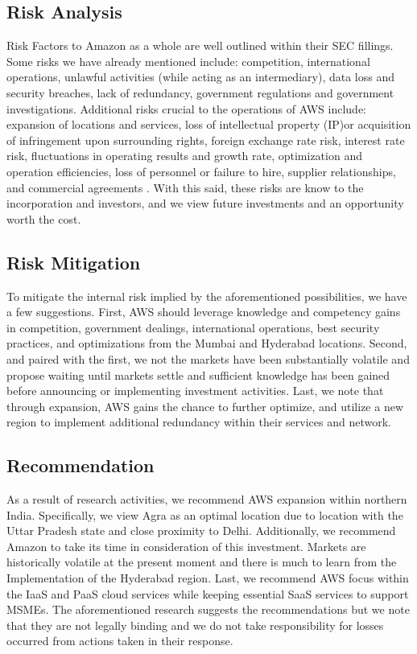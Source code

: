 \documentclass[a4paper, 12pt]{article}
\begin{document}
\subsection{Risk Analysis}
Risk Factors to Amazon as a whole are well outlined within their SEC fillings. 
Some risks we have already mentioned include: competition, international operations, unlawful activities (while acting as an intermediary), data loss and security breaches, lack of redundancy, government regulations and government investigations. 
Additional risks crucial to the operations of AWS include: expansion of locations and services, loss of intellectual property (IP)or acquisition of infringement upon surrounding rights, foreign exchange rate risk, interest rate risk, fluctuations in operating results and growth rate, optimization and operation efficiencies, loss of personnel or failure to hire, supplier relationships, and commercial agreements \cite[p.~6, 8-11]{AMZN_10K_2021}.
With this said, these risks are know to the incorporation and investors, and we view future investments and an opportunity worth the cost. 

\subsection{Risk Mitigation}
To mitigate the internal risk implied by the aforementioned possibilities, we have a few suggestions. 
First, AWS should leverage knowledge and competency gains in competition, government dealings, international operations, best security practices, and optimizations from the Mumbai and Hyderabad locations. 
Second, and paired with the first, we not the markets have been substantially volatile and propose waiting until markets settle and sufficient knowledge has been gained before announcing or implementing investment activities. 
Last, we note that through expansion, AWS gains the chance to further optimize, and utilize a new region to implement additional redundancy within their services and network. 

\subsection{Recommendation}
As a result of research activities, we recommend AWS expansion within northern India. 
Specifically, we view Agra as an optimal location due to location with the Uttar Pradesh state and close proximity to Delhi. 
Additionally, we recommend Amazon to take its time in consideration of this investment. 
Markets are historically volatile at the present moment and there is much to learn from the Implementation of the Hyderabad region. 
Last, we recommend AWS focus within the IaaS and PaaS cloud services while keeping essential SaaS services to support MSMEs. 
The aforementioned research suggests the recommendations but we note that they are not legally binding and we do not take responsibility for losses occurred from actions taken in their response. 
\end{document}
